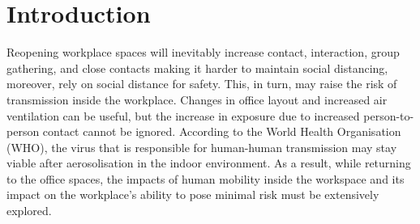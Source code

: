\documentclass[acmtog]{acmart}
\begin{document}
\maketitle

\section{Introduction}
Reopening workplace spaces will inevitably increase contact, interaction, group gathering, and close contacts making it harder to maintain social distancing, moreover, rely on social distance for safety. This, in turn, may raise the risk of transmission inside the workplace. Changes in office layout and increased air ventilation can be useful, but the increase in exposure due to increased person-to-person contact cannot be ignored. According to the World Health Organisation (WHO), the virus that is responsible for human-human transmission may stay viable after aerosolisation in the indoor environment. As a result, while returning to the office spaces, the impacts of human mobility inside the workspace and its impact on the workplace's ability to pose minimal risk must be extensively explored.
\end{document}
